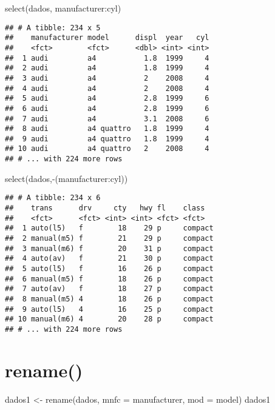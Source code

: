 \documentclass[
]{book}
\newenvironment{Shaded}{\begin{snugshade}}{\end{snugshade}}
\newcommand{\AttributeTok}[1]{\textcolor[rgb]{0.77,0.63,0.00}{#1}}
\newcommand{\FunctionTok}[1]{\textcolor[rgb]{0.00,0.00,0.00}{#1}}
\newcommand{\NormalTok}[1]{#1}
\newcommand{\OtherTok}[1]{\textcolor[rgb]{0.56,0.35,0.01}{#1}}
\newcommand{\SpecialCharTok}[1]{\textcolor[rgb]{0.00,0.00,0.00}{#1}}
\begin{document}
\begin{Shaded}
\begin{Highlighting}[]
\FunctionTok{select}\NormalTok{(dados, manufacturer}\SpecialCharTok{:}\NormalTok{cyl) }
\end{Highlighting}
\end{Shaded}

\begin{verbatim}
## # A tibble: 234 x 5
##    manufacturer model      displ  year   cyl
##    <fct>        <fct>      <dbl> <int> <int>
##  1 audi         a4           1.8  1999     4
##  2 audi         a4           1.8  1999     4
##  3 audi         a4           2    2008     4
##  4 audi         a4           2    2008     4
##  5 audi         a4           2.8  1999     6
##  6 audi         a4           2.8  1999     6
##  7 audi         a4           3.1  2008     6
##  8 audi         a4 quattro   1.8  1999     4
##  9 audi         a4 quattro   1.8  1999     4
## 10 audi         a4 quattro   2    2008     4
## # ... with 224 more rows
\end{verbatim}

\begin{Shaded}
\begin{Highlighting}[]
\FunctionTok{select}\NormalTok{(dados,}\SpecialCharTok{{-}}\NormalTok{(manufacturer}\SpecialCharTok{:}\NormalTok{cyl))}
\end{Highlighting}
\end{Shaded}

\begin{verbatim}
## # A tibble: 234 x 6
##    trans      drv     cty   hwy fl    class  
##    <fct>      <fct> <int> <int> <fct> <fct>  
##  1 auto(l5)   f        18    29 p     compact
##  2 manual(m5) f        21    29 p     compact
##  3 manual(m6) f        20    31 p     compact
##  4 auto(av)   f        21    30 p     compact
##  5 auto(l5)   f        16    26 p     compact
##  6 manual(m5) f        18    26 p     compact
##  7 auto(av)   f        18    27 p     compact
##  8 manual(m5) 4        18    26 p     compact
##  9 auto(l5)   4        16    25 p     compact
## 10 manual(m6) 4        20    28 p     compact
## # ... with 224 more rows
\end{verbatim}

\hypertarget{rename}{%
\section{rename()}\label{rename}}

\begin{Shaded}
\begin{Highlighting}[]
\NormalTok{dados1 }\OtherTok{\textless{}{-}} \FunctionTok{rename}\NormalTok{(dados, }
              \AttributeTok{mnfc =}\NormalTok{ manufacturer,}
              \AttributeTok{mod =}\NormalTok{ model)}
\NormalTok{dados1}
\end{Highlighting}
\end{Shaded}
\end{document}
